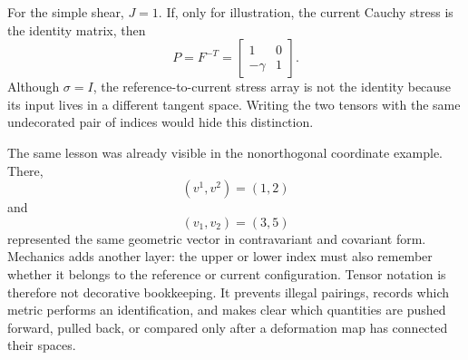 For the simple shear, \(J=1\).  If, only for illustration, the current Cauchy stress is the identity matrix, then
\[
  P=F^{-T}
  =
  \begin{bmatrix}
    1&0\\
    -\gamma&1
  \end{bmatrix}.
\]
Although \(\sigma=I\), the reference-to-current stress array is not the identity because its input lives in a different tangent space.  Writing the two tensors with the same undecorated pair of indices would hide this distinction.

The same lesson was already visible in the nonorthogonal coordinate example.  There,
\[
  (v^1,v^2)=(1,2)
\]
and
\[
  (v_1,v_2)=(3,5)
\]
represented the same geometric vector in contravariant and covariant form.  Mechanics adds another layer: the upper or lower index must also remember whether it belongs to the reference or current configuration.  Tensor notation is therefore not decorative bookkeeping.  It prevents illegal pairings, records which metric performs an identification, and makes clear which quantities are pushed forward, pulled back, or compared only after a deformation map has connected their spaces.
